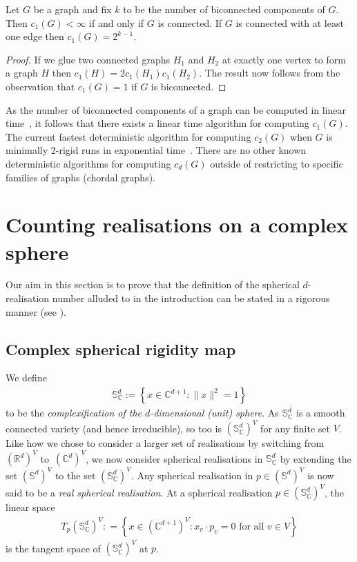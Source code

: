 \documentclass[ALCO]{cedram}
\begin{document}
\begin{proposition}\label{p:1d}
	Let $G$ be a graph and fix $k$ to be the number of biconnected components of $G$.
	Then $c_1(G) < \infty$ if and only if $G$ is connected.
	If $G$ is connected with at least one edge then $c_1(G) = 2^{k-1}$.
\end{proposition}

\begin{proof}
	If we glue two connected graphs $H_1$ and $H_2$ at exactly one vertex to form a graph $H$ then $c_1(H) = 2c_1(H_1)c_1(H_2)$.
	The result now follows from the observation that $c_1(G) = 1$ if $G$ is biconnected.
\end{proof}

As the number of biconnected components of a graph can be computed in linear time~\cite{HopcroftTarjan}, it follows that there exists a linear time algorithm for computing $c_1(G)$.
The current fastest deterministic algorithm for computing $c_2(G)$ when $G$ is minimally 2-rigid runs in exponential time~\cite{PlaneCount}.
There are no other known deterministic algorithms for computing $c_d(G)$ outside of restricting to specific families of graphs (\eg chordal graphs).




\section{Counting realisations on a complex sphere}\label{sec:countsphere}

Our aim in this section is to prove that the definition of the spherical $d$-realisation number alluded to in the introduction can be stated in a rigorous manner (see ).

\subsection{Complex spherical rigidity map}

We define
\begin{align*}
	\mathbb{S}_{\mathbb{C}}^d := \left\{ x \in \mathbb{C}^{d+1} : \|x\|^2=1 \right\}
\end{align*}
to be the \emph{complexification of the $d$-dimensional (unit) sphere}.
As $\mathbb{S}_{\mathbb{C}}^d$ is a smooth connected variety (and hence irreducible),
so too is $(\mathbb{S}_{\mathbb{C}}^{d})^V$ for any finite set $V$.
Like how we chose to consider a larger set of realisations by switching from $(\mathbb{R}^d)^V$ to~$(\mathbb{C}^d)^V$,
we now consider spherical realisations in $\mathbb{S}_\mathbb{C}^d$ by extending the set $(\mathbb{S}^d)^V$ to the set $(\mathbb{S}_{\mathbb{C}}^d)^V$.
Any spherical realisation in $p \in (\mathbb{S}^d)^V$ is now said to be a \emph{real spherical realisation}.
At a spherical realisation $p \in (\mathbb{S}_{\mathbb{C}}^{d})^{V}$,
the linear space
\begin{align*}
	T_p (\mathbb{S}_{\mathbb{C}}^d)^V : =\left\{x \in (\mathbb{C}^{d+1})^V : x_v \cdot p_v=0 \text{ for all } v \in V \right\}
\end{align*}
is the tangent space of $(\mathbb{S}_{\mathbb{C}}^{d})^{V}$ at $p$.
\end{document}

